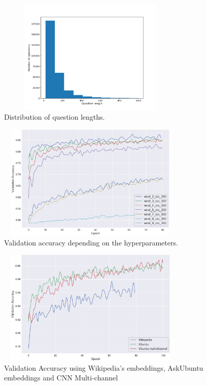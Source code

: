 \documentclass[10pt,twocolumn,letterpaper]{article}
\begin{document}
\begin{figure}[t]
\begin{center}
\includegraphics[width=90mm, height= 55mm, scale=1]{img/Histogram.png}
\end{center}
\caption{Distribution of question lengths.}
\label{fig:lens}
\end{figure}
\begin{figure}[t]
\begin{center}
\includegraphics[width=90mm, height= 55mm, scale=1]{img/wiki.png}
\end{center}
\caption{Validation accuracy depending on the hyperparameters.}
\label{fig:wiki}
\end{figure}
\begin{figure}[t]
\begin{center}
\includegraphics[width=90mm, height= 55mm, scale=1]{img/embeddings_accuracy.png}
\end{center}
\caption{Validation Accuracy using Wikipedia's embeddings, AskUbuntu embeddings and CNN Multi-channel}
\label{fig:embeddings}
\end{figure}
\end{document}
